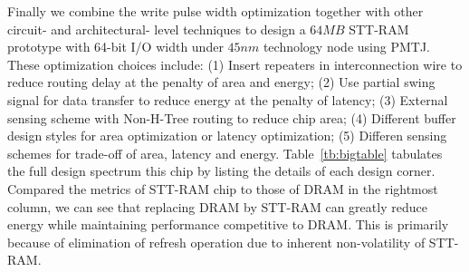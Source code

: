 Finally we combine the write pulse width optimization together with other circuit- and architectural- level techniques to design a $64MB$ STT-RAM prototype with 64-bit I/O width under $45nm$ technology node using PMTJ. These optimization choices include: (1) Insert repeaters in interconnection wire to reduce routing delay at the penalty of area and energy; (2) Use partial swing signal for data transfer to reduce energy at the penalty of latency; (3) External sensing scheme with Non-H-Tree routing to reduce chip area; (4) Different buffer design styles for area optimization or latency optimization; (5) Differen sensing schemes for trade-off of area, latency and energy. Table~\ref{tb:bigtable} tabulates the full design spectrum this chip by listing the details of each design corner. Compared the metrics of STT-RAM chip to those of DRAM in the rightmost column, we can see that replacing DRAM by STT-RAM can greatly reduce energy while maintaining performance competitive to DRAM. This is primarily because of elimination of refresh operation due to inherent non-volatility of STT-RAM.

